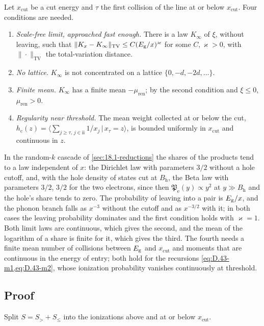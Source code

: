 Let $x_{\mathrm{cut}}$ be a cut energy and $\tau$ the first collision of the line at or below $x_{\mathrm{cut}}$. Four conditions are needed.
\begin{enumerate}
  \item \emph{Scale-free limit, approached fast enough.} There is a law $K_\infty$ of $\xi$, without leaving, such that $\|K_x - K_\infty\|_{\mathrm{TV}} \le C(E_{\mathrm{g}}/x)^\varkappa$ for some $C, \varkappa > 0$, with $\|\cdot\|_{\mathrm{TV}}$ the total-variation distance.
  \item \emph{No lattice.} $K_\infty$ is not concentrated on a lattice $\{0, -d, -2d, \dots\}$.
  \item \emph{Finite mean.} $K_\infty$ has a finite mean $-\mu_{\mathrm{ren}}$; by the second condition and $\xi \le 0$, $\mu_{\mathrm{ren}} > 0$.
  \item \emph{Regularity near threshold.} The mean weight collected at or below the cut, $h_{\mathrm{c}}(z) = \langle\sum_{j \ge \tau,\,j\in\mathrm{ii}}1/x_j\,|\,x_\tau = z\rangle$, is bounded uniformly in $x_{\mathrm{cut}}$ and continuous in $z$.
\end{enumerate}
In the random-$k$ cascade of \cref{sec:18.1-reductions} the shares of the products tend to a law independent of $x$: the Dirichlet law with parameters $3/2$ without a hole cutoff, and, with the hole density of states cut at $B_{\mathrm{h}}$, the Beta law with parameters $3/2$, $3/2$ for the two electrons, since then $\mathfrak{P}_{\mathrm{e}}(y) \propto y^2$ at $y \gg B_{\mathrm{h}}$ and the hole's share tends to zero. The probability of leaving into a pair is $E_{\mathrm{g}}/x$, and the phonon branch falls as $x^{-3}$ without the cutoff and as $x^{-3/2}$ with it; in both cases the leaving probability dominates and the first condition holds with $\varkappa = 1$. Both limit laws are continuous, which gives the second, and the mean of the logarithm of a share is finite for it, which gives the third. The fourth needs a finite mean number of collisions between $E_{\mathrm{g}}$ and $x_{\mathrm{cut}}$ and moments that are continuous in the energy of entry; both hold for the recursions \cref{eq:D.43-m1,eq:D.43-m2}, whose ionization probability vanishes continuously at threshold.

\subsection{Proof}

Split $S = S_> + S_\le$ into the ionizations above and at or below $x_{\mathrm{cut}}$.

